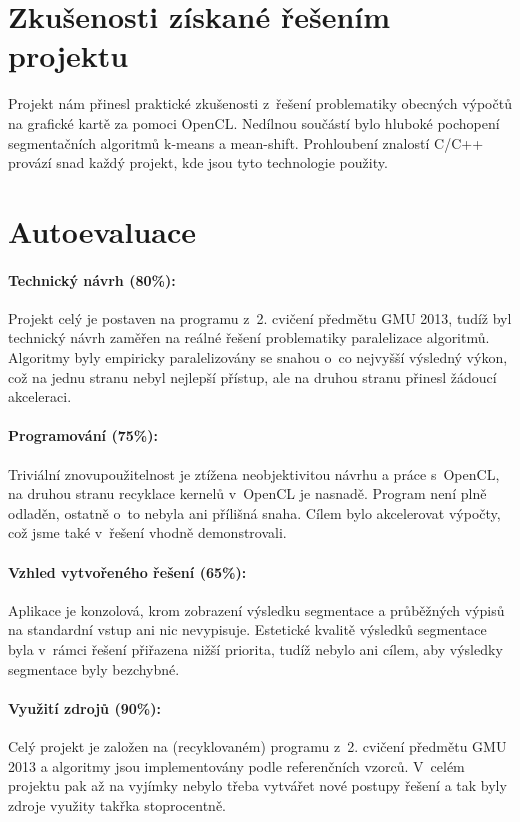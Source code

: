 \documentclass[11pt,a4paper]{article}
\begin{document}
\section{Zkušenosti získané řešením projektu}
Projekt nám přinesl praktické zkušenosti z~řešení problematiky obecných výpočtů na grafické kartě za pomoci OpenCL. Nedílnou součástí bylo hluboké pochopení segmentačních algoritmů k-means a mean-shift. Prohloubení znalostí C/C++ provází snad každý projekt, kde jsou tyto technologie použity.

\section{Autoevaluace}
\paragraph{Technický návrh (80\%):}
Projekt celý je postaven na programu z~2. cvičení předmětu GMU 2013, tudíž byl technický návrh zaměřen na reálné řešení problematiky paralelizace algoritmů. Algoritmy byly empiricky paralelizovány se snahou o~co nejvyšší výsledný výkon, což na jednu stranu nebyl nejlepší přístup, ale na druhou stranu přinesl žádoucí akceleraci.

\paragraph{Programování (75\%):}
Triviální znovupoužitelnost je ztížena neobjektivitou návrhu a práce s~OpenCL, na druhou stranu recyklace kernelů v~OpenCL je nasnadě. Program není plně odladěn, ostatně o~to nebyla ani přílišná snaha. Cílem bylo akcelerovat výpočty, což jsme také v~řešení vhodně demonstrovali.

\paragraph{Vzhled vytvořeného řešení (65\%):}
Aplikace je konzolová, krom zobrazení výsledku segmentace a průběžných výpisů na standardní vstup ani nic nevypisuje. Estetické kvalitě výsledků segmentace byla v~rámci řešení přiřazena nižší priorita, tudíž nebylo ani cílem, aby výsledky segmentace byly bezchybné.

\paragraph{Využití zdrojů (90\%):}
Celý projekt je založen na (recyklovaném) programu z~2. cvičení předmětu GMU 2013 a algoritmy jsou implementovány podle referenčních vzorců. V~celém projektu pak až na vyjímky nebylo třeba vytvářet nové postupy řešení a tak byly zdroje využity takřka stoprocentně.
\end{document}

